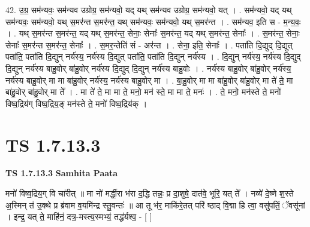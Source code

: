 \documentclass[17pt]{extarticle}
\begin{document}
42. उ॒ग्र॒ सम॑न्यवः॒ सम॑न्यव उग्रोग्र॒ सम॑न्यवो॒ यद् यथ् सम॑न्यव उग्रोग्र॒ सम॑न्यवो॒ यत् । . सम॑न्यवो॒ यद् यथ् सम॑न्यवः॒ सम॑न्यवो॒ यथ् स॒मर॑न्त स॒मर॑न्त॒ यथ् सम॑न्यवः॒ सम॑न्यवो॒ यथ् स॒मर॑न्त । . सम॑न्यव॒ इति स - म॒न्य॒वः॒ । . यथ् स॒मर॑न्त स॒मर॑न्त॒ यद् यथ् स॒मर॑न्त॒ सेनाः॒ सेनाः᳚ स॒मर॑न्त॒ यद् यथ् स॒मर॑न्त॒ सेनाः᳚ । . स॒मर॑न्त॒ सेनाः॒ सेनाः᳚ स॒मर॑न्त स॒मर॑न्त॒ सेनाः᳚ । . स॒मर॒न्तेति॑ सं - अर॑न्त । . सेना॒ इति॒ सेनाः᳚ । . पता॑ति दि॒द्युद् दि॒द्युत् पता॑ति॒ पता॑ति दि॒द्युन् नर्य॑स्य॒ नर्य॑स्य दि॒द्युत् पता॑ति॒ पता॑ति दि॒द्युन् नर्य॑स्य । . दि॒द्युन् नर्य॑स्य॒ नर्य॑स्य दि॒द्युद् दि॒द्युन् नर्य॑स्य बाहु॒वोर् बा॑हु॒वोर् नर्य॑स्य दि॒द्युद् दि॒द्युन् नर्य॑स्य बाहु॒वोः । . नर्य॑स्य बाहु॒वोर् बा॑हु॒वोर् नर्य॑स्य॒ नर्य॑स्य बाहु॒वोर् मा मा बा॑हु॒वोर् नर्य॑स्य॒ नर्य॑स्य बाहु॒वोर् मा । . बा॒हु॒वोर् मा मा बा॑हु॒वोर् बा॑हु॒वोर् मा ते॑ ते॒ मा बा॑हु॒वोर् बा॑हु॒वोर् मा ते᳚ । . मा ते॑ ते॒ मा मा ते॒ मनो॒ मन॑ स्ते॒ मा मा ते॒ मनः॑ । . ते॒ मनो॒ मन॑स्ते ते॒ मनो॑ विष्व॒द्रिय॑ग् विष्व॒द्रिय॒ङ् मन॑स्ते ते॒ मनो॑ विष्व॒द्रिय॑क् । \newline
\pagebreak
{}

\section{ TS 1.7.13.3 }

\textbf{TS 1.7.13.3 } \newline
\textbf{Samhita Paata} \newline

मनो॑ विष्व॒द्रिय॒ग् वि चा॑रीत् ॥ मा नो॑ मर्द्धी॒रा भ॑रा द॒द्धि तन्नः॒ प्र दा॒शुषे॒ दात॑वे॒ भूरि॒ यत् ते᳚ । नव्ये॑ दे॒ष्णे श॒स्ते अ॒स्मिन् त॑ उ॒क्थे प्र ब्र॑वाम व॒यमि॑न्द्र स्तु॒वन्तः॑ ॥ आ तू भ॑र॒ माकि॑रे॒तत् परि॑ ष्ठाद् वि॒द्मा हि त्वा॒ वसु॑पतिं॒ ॅवसू॑नां । इन्द्र॒ यत् ते॒ माहि॑नं॒ दत्र॒-मस्त्य॒स्मभ्यं॒ तद्ध॑र्यश्व॒ - [ ] \newline
\end{document}
